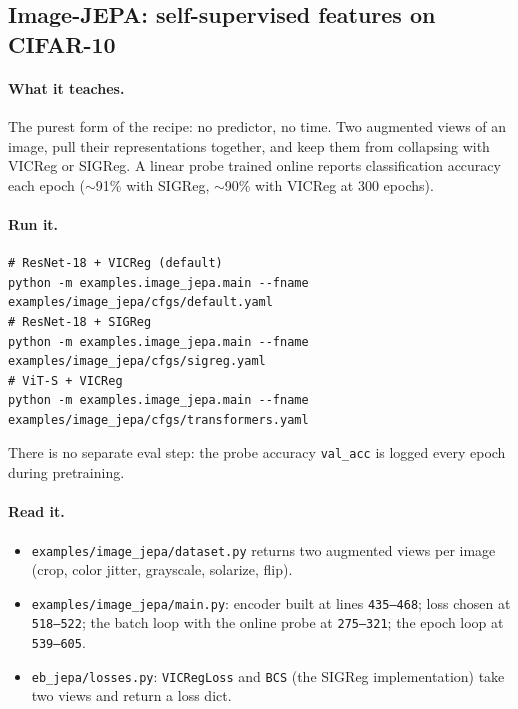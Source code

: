 \documentclass{article}
\newcommand{\code}[1]{\texttt{\small #1}}
\newcommand{\file}[1]{\texttt{\small #1}}
\begin{document}
\subsection{Image-JEPA: self-supervised features on CIFAR-10}
\label{sec:image}

\paragraph{What it teaches.} The purest form of the recipe: no predictor, no
time. Two augmented views of an image, pull their representations together, and
keep them from collapsing with VICReg or SIGReg. A linear probe trained online
reports classification accuracy each epoch ($\sim$91\% with SIGReg, $\sim$90\%
with VICReg at 300 epochs).

\paragraph{Run it.}
\begin{lstlisting}[style=bash]
# ResNet-18 + VICReg (default)
python -m examples.image_jepa.main --fname examples/image_jepa/cfgs/default.yaml
# ResNet-18 + SIGReg
python -m examples.image_jepa.main --fname examples/image_jepa/cfgs/sigreg.yaml
# ViT-S + VICReg
python -m examples.image_jepa.main --fname examples/image_jepa/cfgs/transformers.yaml
\end{lstlisting}
There is no separate eval step: the probe accuracy \code{val\_acc} is logged every
epoch during pretraining.

\paragraph{Read it.}
\begin{itemize}[leftmargin=1.4em,itemsep=1pt,topsep=2pt]
  \item \file{examples/image\_jepa/dataset.py} returns two augmented views per
    image (crop, color jitter, grayscale, solarize, flip).
  \item \file{examples/image\_jepa/main.py}: encoder built at lines
    \code{435--468}; loss chosen at \code{518--522}; the batch loop with the
    online probe at \code{275--321}; the epoch loop at \code{539--605}.
  \item \file{eb\_jepa/losses.py}: \code{VICRegLoss} and \code{BCS} (the SIGReg
    implementation) take two views and return a loss dict.
\end{itemize}
\end{document}
